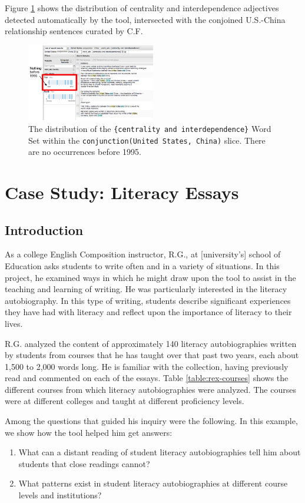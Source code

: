 \documentclass{sig-alternate}
\newcommand{\code}[1] {\texttt{#1}}
\begin{document}
Figure \ref{fig:chris07} shows the distribution of centrality and interdependence adjectives detected automatically by the tool, intersected with the conjoined U.S.-China relationship sentences curated by C.F.
\begin{figure}[h!]
\includegraphics[width=0.5\textwidth]{fig/chris/07.png}
\caption{ The distribution of the \code{\{centrality and interdependence\}} Word Set within the \code{conjunction(United States, China)} slice. There are no occurrences before 1995. \label{fig:chris07}}
\end{figure}


\section{Case Study: Literacy Essays}

\subsection{Introduction}
As a college English Composition instructor,  R.G., at  [university's] school of Education asks students to write often and in a variety of situations. In this project, he examined ways in which he might draw upon the tool to assist in the teaching and learning of writing. He was particularly interested in the literacy autobiography. In this type of writing, students describe significant experiences they have had with literacy and reflect upon the importance of literacy to their lives.  

R.G. analyzed the content of approximately 140 literacy autobiographies written by students from courses that he has taught over that past two years, each about 1,500 to 2,000 words long. He is familiar with the collection, having previously read and commented on each of the essays.  Table \ref{table:rex-courses} shows the different courses from which literacy autobiographies were analyzed. The courses were at different colleges and taught at different proficiency levels.

Among the questions that guided his inquiry were the following. In this example, we show how the tool helped him get answers:
\begin{enumerate}
\item What can a distant reading of student literacy autobiographies tell him about students that close readings cannot?
\item What patterns exist in student literacy autobiographies at different course levels and institutions?
\end{enumerate}
\end{document}
